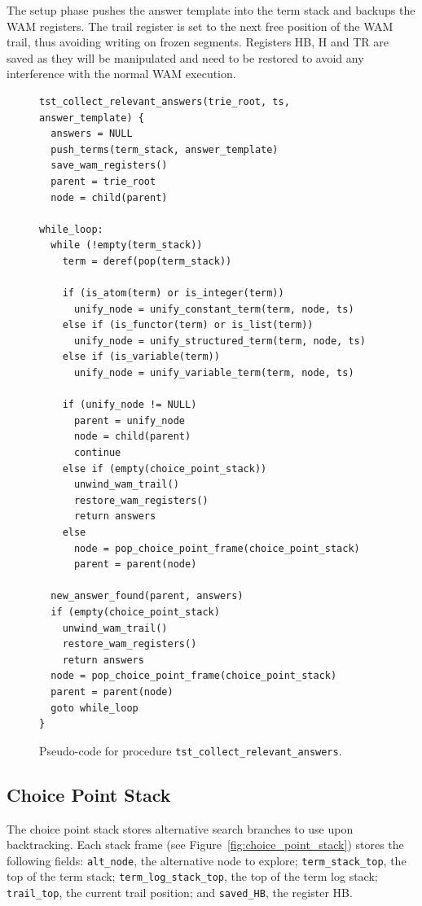 The setup phase pushes the answer template into the term stack and backups the WAM registers.
The trail register is set to the next free position
of the WAM trail, thus avoiding writing on frozen segments. Registers HB, H and TR are
saved as they will be manipulated and need to be restored to avoid any interference with
the normal WAM execution.

\begin{figure}[ht]
\begin{Verbatim}
tst_collect_relevant_answers(trie_root, ts, answer_template) {
  answers = NULL
  push_terms(term_stack, answer_template)
  save_wam_registers()
  parent = trie_root
  node = child(parent)
  
while_loop:
  while (!empty(term_stack))
    term = deref(pop(term_stack))
    
    if (is_atom(term) or is_integer(term))
      unify_node = unify_constant_term(term, node, ts)
    else if (is_functor(term) or is_list(term))
      unify_node = unify_structured_term(term, node, ts)
    else if (is_variable(term))
      unify_node = unify_variable_term(term, node, ts)
      
    if (unify_node != NULL)
      parent = unify_node
      node = child(parent)
      continue
    else if (empty(choice_point_stack))
      unwind_wam_trail()
      restore_wam_registers()
      return answers
    else
      node = pop_choice_point_frame(choice_point_stack)
      parent = parent(node)
  
  new_answer_found(parent, answers)
  if (empty(choice_point_stack)
    unwind_wam_trail()
    restore_wam_registers()
    return answers
  node = pop_choice_point_frame(choice_point_stack)
  parent = parent(node)
  goto while_loop
}
\end{Verbatim}
\caption{Pseudo-code for procedure \texttt{tst\_collect\_relevant\_answers}.}
\label{fig:tst_collect_relevant_answers}
\end{figure}

\subsection{Choice Point Stack}\label{sec:cpstack_section}

The choice point stack stores alternative search branches to use upon backtracking.
Each stack frame (see Figure~\ref{fig:choice_point_stack}) stores the following fields:
\texttt{alt\_node}, the alternative node to explore;
\texttt{term\_stack\_top}, the top of the term stack;
\texttt{term\_log\_stack\_top}, the top of the term log stack;
\texttt{trail\_top}, the current trail position;
and \texttt{saved\_HB}, the register HB.

